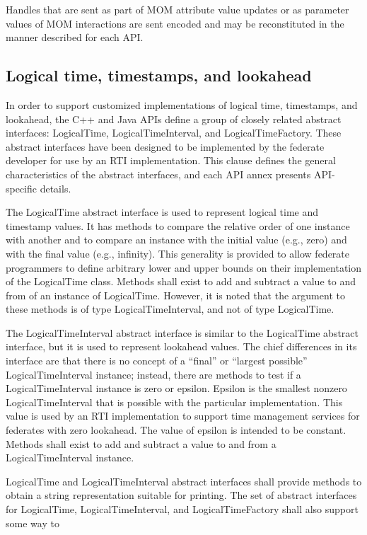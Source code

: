 \begin{compactstdpage}
    Handles that are sent as part of MOM attribute value updates or as parameter values of MOM interactions are sent encoded and may be reconstituted in the manner described for each API.

    \subsection{Logical time, timestamps, and lookahead}

    In order to support customized implementations of logical time, timestamps, and lookahead, the C++ and Java APIs define a group of closely related abstract interfaces: LogicalTime, LogicalTimeInterval, and LogicalTimeFactory. These abstract interfaces have been designed to be implemented by the federate developer for use by an RTI implementation. This clause defines the general characteristics of the abstract interfaces, and each API annex presents API-specific details.

    The LogicalTime abstract interface is used to represent logical time and timestamp values. It has methods to compare the relative order of one instance with another and to compare an instance with the initial value (e.g., zero) and with the final value (e.g., infinity). This generality is provided to allow federate programmers to define arbitrary lower and upper bounds on their implementation of the LogicalTime class. Methods shall exist to add and subtract a value to and from of an instance of LogicalTime. However, it is noted that the argument to these methods is of type LogicalTimeInterval, and not of type LogicalTime.

    The LogicalTimeInterval abstract interface is similar to the LogicalTime abstract interface, but it is used to represent lookahead values. The chief differences in its interface are that there is no concept of a ``final'' or ``largest possible'' LogicalTimeInterval instance; instead, there are methods to test if a LogicalTimeInterval instance is zero or epsilon. Epsilon is the smallest nonzero LogicalTimeInterval that is possible with the particular implementation. This value is used by an RTI implementation to support time management services for federates with zero lookahead. The value of epsilon is intended to be constant. Methods shall exist to add and subtract a value to and from a LogicalTimeInterval instance.

    LogicalTime and LogicalTimeInterval abstract interfaces shall provide methods to obtain a string representation suitable for printing. The set of abstract interfaces for LogicalTime, LogicalTimeInterval, and LogicalTimeFactory shall also support some way to


\end{compactstdpage}
